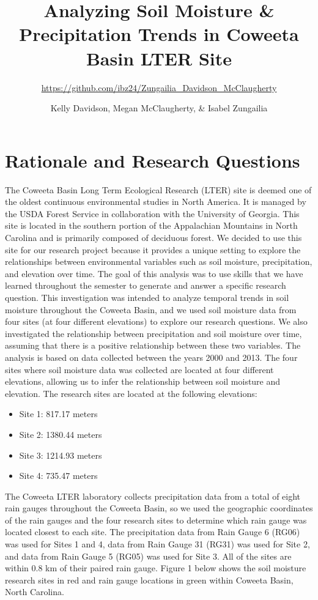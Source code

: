 \documentclass[
  12pt,
]{article}
\title{Analyzing Soil Moisture \& Precipitation Trends in Coweeta Basin
LTER Site}
\subtitle{\url{https://github.com/ibz24/Zungailia_Davidson_McClaugherty}}
\author{Kelly Davidson, Megan McClaugherty, \& Isabel Zungailia}
\date{}
\providecommand{\tightlist}{%
  \setlength{\itemsep}{0pt}\setlength{\parskip}{0pt}}
\begin{document}
\maketitle

\newpage
\tableofcontents 
\newpage
\listoftables 
\newpage
\listoffigures 
\newpage

\hypertarget{rationale-and-research-questions}{%
\section{Rationale and Research
Questions}\label{rationale-and-research-questions}}

The Coweeta Basin Long Term Ecological Research (LTER) site is deemed
one of the oldest continuous environmental studies in North America. It
is managed by the USDA Forest Service in collaboration with the
University of Georgia. This site is located in the southern portion of
the Appalachian Mountains in North Carolina and is primarily composed of
deciduous forest. We decided to use this site for our research project
because it provides a unique setting to explore the relationships
between environmental variables such as soil moisture, precipitation,
and elevation over time. The goal of this analysis was to use skills
that we have learned throughout the semester to generate and answer a
specific research question. This investigation was intended to analyze
temporal trends in soil moisture throughout the Coweeta Basin, and we
used soil moisture data from four sites (at four different elevations)
to explore our research questions. We also investigated the relationship
between precipitation and soil moisture over time, assuming that there
is a positive relationship between these two variables. The analysis is
based on data collected between the years 2000 and 2013. The four sites
where soil moisture data was collected are located at four different
elevations, allowing us to infer the relationship between soil moisture
and elevation. The research sites are located at the following
elevations:

\begin{itemize}
\tightlist
\item
  Site 1: 817.17 meters
\item
  Site 2: 1380.44 meters
\item
  Site 3: 1214.93 meters
\item
  Site 4: 735.47 meters
\end{itemize}

The Coweeta LTER laboratory collects precipitation data from a total of
eight rain gauges throughout the Coweeta Basin, so we used the
geographic coordinates of the rain gauges and the four research sites to
determine which rain gauge was located closest to each site. The
precipitation data from Rain Gauge 6 (RG06) was used for Sites 1 and 4,
data from Rain Gauge 31 (RG31) was used for Site 2, and data from Rain
Gauge 5 (RG05) was used for Site 3. All of the sites are within 0.8 km
of their paired rain gauge. Figure 1 below shows the soil moisture
research sites in red and rain gauge locations in green within Coweeta
Basin, North Carolina.
\end{document}
